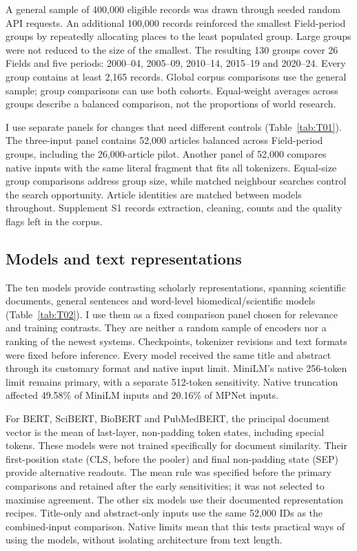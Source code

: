 \documentclass[12pt]{article}
\begin{document}
A general sample of 400,000 eligible records was drawn through seeded random API requests. An additional 100,000 records reinforced the smallest Field-period groups by repeatedly allocating places to the least populated group. Large groups were not reduced to the size of the smallest. The resulting 130 groups cover 26 Fields and five periods: 2000--04, 2005--09, 2010--14, 2015--19 and 2020--24. Every group contains at least 2,165 records. Global corpus comparisons use the general sample; group comparisons can use both cohorts. Equal-weight averages across groups describe a balanced comparison, not the proportions of world research.

I use separate panels for changes that need different controls (Table~\ref{tab:T01}). The three-input panel contains 52,000 articles balanced across Field-period groups, including the 26,000-article pilot. Another panel of 52,000 compares native inputs with the same literal fragment that fits all tokenizers. Equal-size group comparisons address group size, while matched neighbour searches control the search opportunity. Article identities are matched between models throughout. Supplement S1 records extraction, cleaning, counts and the quality flags left in the corpus.


\subsection{Models and text representations}
The ten models provide contrasting scholarly representations, spanning scientific documents, general sentences and word-level biomedical/scientific models (Table~\ref{tab:T02}). I use them as a fixed comparison panel chosen for relevance and training contrasts. They are neither a random sample of encoders nor a ranking of the newest systems. Checkpoints, tokenizer revisions and text formats were fixed before inference. Every model received the same title and abstract through its customary format and native input limit. MiniLM's native 256-token limit remains primary, with a separate 512-token sensitivity. Native truncation affected 49.58\% of MiniLM inputs and 20.16\% of MPNet inputs.

For BERT, SciBERT, BioBERT and PubMedBERT, the principal document vector is the mean of last-layer, non-padding token states, including special tokens. These models were not trained specifically for document similarity. Their first-position state (CLS, before the pooler) and final non-padding state (SEP) provide alternative readouts. The mean rule was specified before the primary comparisons and retained after the early sensitivities; it was not selected to maximise agreement. The other six models use their documented representation recipes. Title-only and abstract-only inputs use the same 52,000 IDs as the combined-input comparison. Native limits mean that this tests practical ways of using the models, without isolating architecture from text length.

\end{document}
